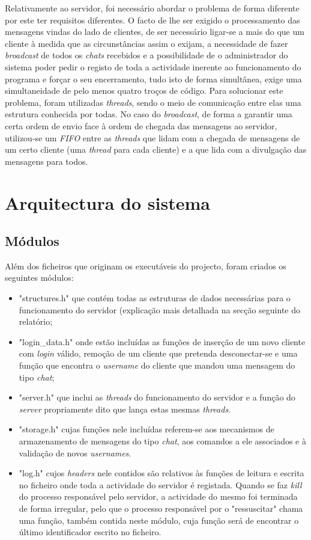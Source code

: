 \documentclass[a4paper]{article}
\begin{document}
Relativamente ao servidor, foi necessário abordar o problema de forma diferente por este ter requisitos diferentes. O facto de lhe ser exigido o processamento das mensagens vindas do lado de clientes,
 de ser necessário ligar-se a mais do que um cliente à medida que as circunstâncias assim o exijam, 
 a necessidade de fazer \textit{broadcast} de todos os \textit{chats} recebidos
 e a possibilidade de o administrador do sistema poder pedir o registo de toda a actividade inerente ao funcionamento do programa e forçar o seu encerramento,
  tudo isto de forma simultânea, 
  exige uma simultaneidade de pelo menos quatro troços de código. Para solucionar este problema, foram utilizadas \textit{threads}, sendo o meio de comunicação entre elas uma estrutura conhecida por todas. No caso do \textit{broadcast}, de forma a garantir uma certa ordem de envio face à ordem de chegada das mensagens ao servidor, utilizou-se um \textit{FIFO} entre as \textit{threads} que lidam com a chegada de mensagens de um certo cliente (uma \textit{thread} para cada cliente) e a que lida com a divulgação das mensagens para todos.

\section{Arquitectura do sistema}

\subsection{Módulos}
Além dos ficheiros que originam os executáveis do projecto, foram criados os seguintes módulos:

\begin{itemize}
\item "structures.h" que contém todas as estruturas de dados necessárias para o funcionamento do servidor (explicação mais detalhada na secção seguinte do relatório;
\item "login\_data.h" onde estão incluídas as funções de inserção de um novo cliente com \textit{login} válido, remoção de um cliente que pretenda desconectar-se e uma função que encontra o \textit{username} do cliente que mandou uma mensagem do tipo \textit{chat};
\item "server.h" que inclui as \textit{threads} do funcionamento do servidor e a função do \textit{server} propriamente dito que lança estas mesmas \textit{threads}.
\item "storage.h" cujas funções nele incluídas referem-se aos mecanismos de armazenamento de mensagens do tipo \textit{chat}, aos comandos a ele associados e à validação de novos \textit{usernames}. 
\item "log.h" cujos \textit{headers} nele contidos são relativos às funções de leitura e escrita no ficheiro onde toda a actividade do servidor é registada. Quando se faz \textit{kill} do processo responsável pelo servidor, a actividade do mesmo foi terminada de forma irregular, pelo que o processo responsável por o "ressuscitar" chama uma função, também contida neste módulo, cuja função será de encontrar o último identificador escrito no ficheiro.
\end{itemize}
\end{document}
